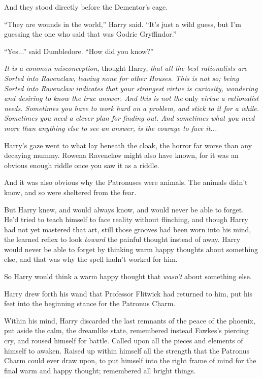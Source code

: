 And they stood directly before the Dementor's cage.

``They are wounds in the world,'' Harry said. ``It's just a wild guess,
but I'm guessing the one who said that was Godric Gryffindor.''

``Yes...'' said Dumbledore. ``How did you know?''

\emph{It is a common misconception}, thought Harry, \emph{that all the
best rationalists are Sorted into Ravenclaw, leaving none for other
Houses. This is not so; being Sorted into Ravenclaw indicates that your
strongest virtue is curiosity, wondering and desiring to know the true
answer. And this is not the} only \emph{virtue a rationalist needs.
Sometimes you have to work hard on a problem, and stick to it for a
while. Sometimes you need a clever plan for finding out. And sometimes
what you need more than anything else to see an answer, is the courage
to face it...}

Harry's gaze went to what lay beneath the cloak, the horror far worse
than any decaying mummy. Rowena Ravenclaw might also have known, for it
was an obvious enough riddle once you saw it as a riddle.

And it was also obvious why the Patronuses were animals. The animals
didn't know, and so were sheltered from the fear.

But Harry knew, and would always know, and would never be able to
forget. He'd tried to teach himself to face reality without flinching,
and though Harry had not yet mastered that art, still those grooves had
been worn into his mind, the learned reflex to look \emph{toward} the
painful thought instead of away. Harry would never be able to forget by
thinking warm happy thoughts about something else, and that was why the
spell hadn't worked for him.

So Harry would think a warm happy thought that \emph{wasn't} about
something else.

Harry drew forth his wand that Professor Flitwick had returned to him,
put his feet into the beginning stance for the Patronus Charm.

Within his mind, Harry discarded the last remnants of the peace of the
phoenix, put aside the calm, the dreamlike state, remembered instead
Fawkes's piercing cry, and roused himself for battle. Called upon all
the pieces and elements of himself to awaken. Raised up within himself
all the strength that the Patronus Charm could ever draw upon, to put
himself into the right frame of mind for the final warm and happy
thought; remembered all bright things.

